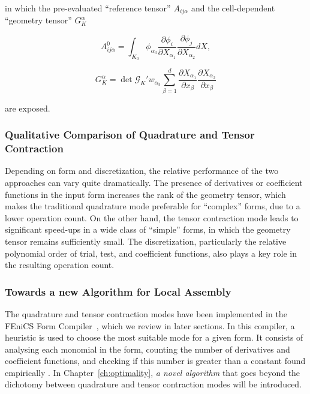 in which the pre-evaluated ``reference tensor'' $A_{i j \alpha}$ and the cell-dependent ``geometry tensor'' $G_{K}^\alpha$

\begin{equation}
A_{i j \alpha}^0 = \int_{K_0} \phi_{\alpha_3} \frac{\partial \phi_{i}}{\partial X_{\alpha_1}} \frac{\partial \phi_{j}}{\partial X_{\alpha_2}} dX,
\end{equation}

\begin{equation}
G_{K}^\alpha = \operatorname{det} \mathcal{G}_K' w_{\alpha_3} \sum_{\beta=1}^d \frac{\partial X_{\alpha_1}}{\partial x_{\beta}} \frac{\partial X_{\alpha_2}}{\partial x_{\beta}}
\end{equation}

are exposed.


\subsubsection{Qualitative Comparison of Quadrature and Tensor Contraction}
Depending on form and discretization, the relative performance of the two approaches can vary quite dramatically. The presence of derivatives or coefficient functions in the input form increases the rank of the geometry tensor, which makes the traditional quadrature mode preferable for ``complex'' forms, due to a lower operation count. On the other hand, the tensor contraction mode leads to significant speed-ups in a wide class of ``simple'' forms, in which the geometry tensor remains sufficiently small. The discretization, particularly the relative polynomial order of trial, test, and coefficient functions, also plays a key role in the resulting operation count. 

\subsubsection{Towards a new Algorithm for Local Assembly}
The quadrature and tensor contraction modes have been implemented in the FEniCS Form Compiler~\citep{FFC-TC}, which we review in later sections. In this compiler, a heuristic is used to choose the most suitable mode for a given form. It consists of analysing each monomial in the form, counting the number of derivatives and coefficient functions, and checking if this number is greater than a constant found empirically \citep{Fenics}. In Chapter~\ref{ch:optimality}, {\em a novel algorithm} that goes beyond the dichotomy between quadrature and tensor contraction modes will be introduced. 


